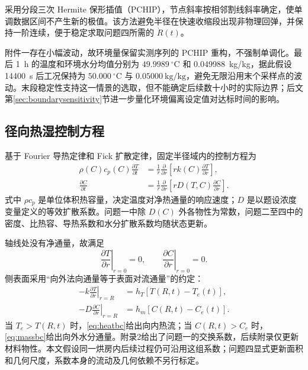 采用分段三次 Hermite 保形插值（PCHIP），节点斜率按相邻割线斜率确定，使单调数据区间不产生新的极值。该方法避免半径在快速收缩段出现非物理回弹，并保持一阶连续，便于稳定求取问题四所需的 $\dot R(t)$。

附件一存在小幅波动，故环境量保留实测序列的 PCHIP 重构，不强制单调化。最后 1~h 的温度和环境水分均值分别为 $49.9989~{}^\circ\mathrm C$ 和 0.049988~kg/kg，据此假设 14400~s 后工况保持为 $50.000~{}^\circ\mathrm C$ 与 $0.05000~\mathrm{kg/kg}$，避免无限沿用末个采样点的波动。末段稳定性支持这一情景的选取，但不能确定后续数十小时的实际边界；后文第\ref{sec:boundarysensitivity}节进一步量化环境偏离设定值对达标时间的影响。

\subsection{径向热湿控制方程}

基于 Fourier 导热定律和 Fick 扩散定律\cite{luikov1975}，固定半径域内的控制方程为
\begin{align}
\rho(C)c_p(C)\frac{\partial T}{\partial t}
&=\frac{1}{r}\frac{\partial}{\partial r}\left[rk(C)\frac{\partial T}{\partial r}\right],\label{eq:heat}\\
\frac{\partial C}{\partial t}
&=\frac{1}{r}\frac{\partial}{\partial r}\left[rD(T,C)\frac{\partial C}{\partial r}\right].\label{eq:mass}
\end{align}
式中 $\rho c_p$ 是单位体积热容量，决定温度对净热通量的响应速度；$D$ 是以题设浓度变量定义的等效扩散系数。问题一中除 $D(C)$ 外各物性为常数，问题二至四中的密度、比热容、导热系数和水分扩散系数均随状态更新。

轴线处没有净通量，故满足
\begin{equation}
\left.\frac{\partial T}{\partial r}\right|_{r=0}=0,\qquad
\left.\frac{\partial C}{\partial r}\right|_{r=0}=0.
\label{eq:center}
\end{equation}
侧表面采用“向外法向通量等于表面对流通量”的约定：
\begin{align}
-k\left.\frac{\partial T}{\partial r}\right|_{r=R}
&=h_T[T(R,t)-T_e(t)],\label{eq:heatbc}\\
-D\left.\frac{\partial C}{\partial r}\right|_{r=R}
&=h_m[C(R,t)-C_e(t)].\label{eq:massbc}
\end{align}
当 $T_e>T(R,t)$ 时，\cref{eq:heatbc}给出向内热流；当 $C(R,t)>C_e$ 时，\cref{eq:massbc}给出向外水分通量。附录2给出了问题一的交换系数，后续附录仅更新材料物性。本文假设同一烘房内后续过程仍可沿用这组系数；问题四显式更新面积和几何尺度，系数本身的流动及几何依赖不另行标定。

